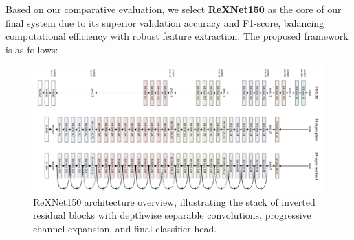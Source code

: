Based on our comparative evaluation, we select \textbf{ReXNet150} as the core of our final system due to its superior validation accuracy and F1-score, balancing computational efficiency with robust feature extraction. The proposed framework is as follows:

\begin{figure}[H]
  \centering
  \includegraphics[width=1.0\textwidth]{./figures/ResNet.png}
  \caption{ReXNet150 architecture overview, illustrating the stack of inverted residual blocks with depthwise separable convolutions, progressive channel expansion, and final classifier head.}
  \label{fig:rexnet150_arch}
\end{figure}

